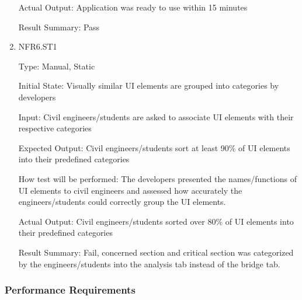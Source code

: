 \documentclass[12pt, titlepage]{article}
\begin{document}
\begin{enumerate}
Actual Output: Application was ready to use within 15 minutes

Result Summary: Pass

\item{NFR6.ST1\\}

Type: Manual, Static

Initial State: Visually similar UI elements are grouped into categories by developers

Input: Civil engineers/students are asked to associate UI elements with their respective categories

Expected Output: Civil engineers/students sort at least 90\% of UI elements into their predefined categories

How test will be performed: The developers presented the names/functions of UI elements to civil engineers and assessed how accurately the engineers/students could correctly group the UI elements.

Actual Output: Civil engineers/students sorted over 80\% of UI elements into their predefined categories

Result Summary: Fail, concerned section and critical section was categorized by the engineers/students into the analysis tab instead of the bridge tab.

\end{enumerate}

\subsubsection{Performance Requirements}
\end{document}
